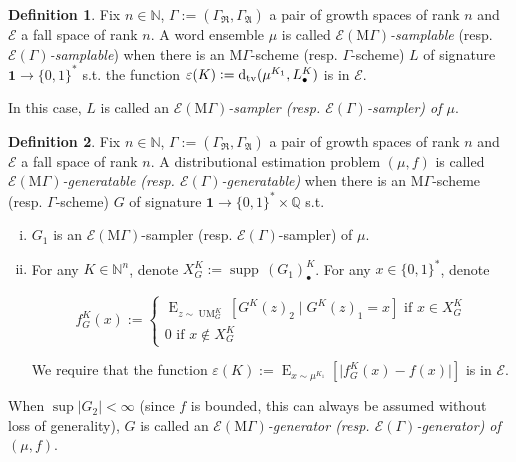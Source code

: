 \documentclass{article}
\numberwithin{equation}{section}
\theoremstyle{definition}
\newtheorem{definition}{Definition}[section]
\theoremstyle{plain}
\newcommand{\Words}{{\{ 0, 1 \}^*}}
\DeclareMathOperator{\Supp}{supp}
\DeclareMathOperator{\E}{E}
\DeclareMathOperator{\UM}{UM}
\newcommand{\Dtv}{\operatorname{d}_{\textnormal{tv}}}
\newcommand{\Nats}{\mathbb{N}}
\newcommand{\Rats}{\mathbb{Q}}
\newcommand{\Abs}[1]{\lvert #1 \rvert}
\newcommand{\GrowR}{\Gamma_{\mathfrak{R}}}
\newcommand{\GrowA}{\Gamma_{\mathfrak{A}}}
\newcommand{\Grow}{\Gamma:=(\GrowR,\GrowA)}
\newcommand{\MGrow}{\mathrm{M}\Gamma}
\newcommand{\Fall}{\mathcal{E}}
\begin{document}
\begin{samepage}
\begin{definition}

Fix $n \in \Nats$, $\Grow$ a pair of growth spaces of rank $n$ and $\Fall$ a fall space of rank $n$. A word ensemble $\mu$ is called \emph{$\Fall(\MGrow)$-samplable} (resp. \emph{$\Fall(\Gamma)$-samplable}) when there is an $\MGrow$-scheme (resp. $\Gamma$-scheme) $L$ of signature $\bm{1} \rightarrow \Words$  s.t. the function $\varepsilon(K):=\Dtv(\mu^{K_1},L_\bullet^K)$ is in $\Fall$.

In this case, $L$ is called an \emph{$\Fall(\MGrow)$-sampler (resp. $\Fall(\Gamma)$-sampler) of $\mu$}.

\end{definition}
\end{samepage}

\begin{samepage}
\begin{definition}

Fix $n \in \Nats$, $\Grow$ a pair of growth spaces of rank $n$ and $\Fall$ a fall space of rank $n$. A distributional estimation problem $(\mu,f)$ is called \emph{$\Fall(\MGrow)$-generatable (resp. $\Fall(\Gamma)$-generatable)} when there is an $\MGrow$-scheme (resp. $\Gamma$-scheme) $G$ of signature $\bm{1} \rightarrow \Words \times \Rats$ s.t. 

\begin{enumerate}[(i)]

\item $G_1$ is an $\Fall(\MGrow)$-sampler (resp. $\Fall(\Gamma)$-sampler) of $\mu$.

\item For any $K \in \Nats^n$, denote $X_{G}^K:=\Supp \, (G_1)_\bullet^K$. For any $x \in \Words$, denote 

$$f_G^K(x):=\begin{cases}\E_{z \sim\UM_G^K}[G^K(z)_2 \mid G^K(z)_1 = x] \text{ if } x \in X_{G}^K \\ 0 \text{ if } x \not\in X_{G}^K \end{cases}$$

We require that the function $\varepsilon(K):=\E_{x \sim \mu^{K_1}}[\Abs{f_G^K(x)-f(x)}]$ is in $\Fall$.

\end{enumerate}

When $\sup{\Abs{G_2}} < \infty$ (since $f$ is bounded, this can always be assumed without loss of generality), $G$ is called an \emph{$\Fall(\MGrow)$-generator (resp. $\Fall(\Gamma)$-generator) of $(\mu,f)$}.

\end{definition}
\end{samepage}
\end{document}
